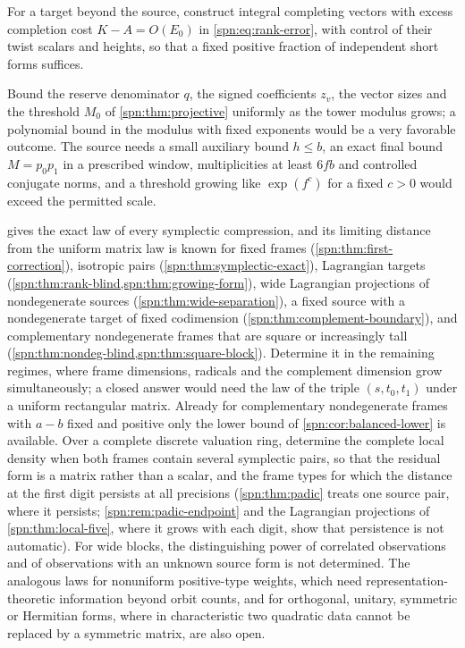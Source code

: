 \begin{question}\label{spn:q:completion}
For a target beyond the source, construct integral completing vectors with
excess completion cost $K-A=O(E_0)$ in \eqref{spn:eq:rank-error}, with control
of their twist scalars and heights, so that a fixed positive fraction of
independent short forms suffices.
\end{question}

\begin{question}\label{spn:q:frames}
Bound the reserve denominator $q$, the signed coefficients $z_v$, the vector
sizes and the threshold $M_0$ of \cref{spn:thm:projective} uniformly as the
tower modulus grows; a polynomial bound in the modulus with fixed exponents
would be a very favorable outcome. The source needs a small auxiliary bound
$h\le b$, an exact final bound $M=p_0p_1$ in a prescribed window,
multiplicities at least $6fb$ and controlled conjugate norms, and a threshold
growing like $\exp(f^{c})$ for a fixed $c>0$ would exceed the permitted
scale.
\end{question}

\begin{question}\label{spn:q:symplectic}
 gives the exact law of every symplectic compression, and its
limiting distance from the uniform matrix law is known for fixed frames
(\cref{spn:thm:first-correction}), isotropic pairs (\cref{spn:thm:symplectic-exact}),
Lagrangian targets (\cref{spn:thm:rank-blind,spn:thm:growing-form}), wide Lagrangian projections of
nondegenerate sources (\cref{spn:thm:wide-separation}), a fixed source with a
nondegenerate target of fixed codimension (\cref{spn:thm:complement-boundary}), and
complementary nondegenerate frames that are square or increasingly tall
(\cref{spn:thm:nondeg-blind,spn:thm:square-block}). Determine it in the remaining regimes, where
frame dimensions, radicals and the complement dimension grow simultaneously; a closed answer
would need the law of the triple $(s,t_0,t_1)$ under a uniform rectangular matrix. Already for
complementary nondegenerate frames with $a-b$ fixed and positive only the lower bound of
\cref{spn:cor:balanced-lower} is available. Over a complete discrete valuation ring, determine
the complete local density when both frames contain several symplectic pairs, so that the
residual form is a matrix rather than a scalar, and the frame types for which the distance at
the first digit persists at all precisions (\cref{spn:thm:padic} treats one source pair, where it
persists; \cref{spn:rem:padic-endpoint} and the Lagrangian projections of \cref{spn:thm:local-five},
where it grows with each digit, show that persistence is not automatic). For wide blocks, the
distinguishing power of correlated observations and of observations with an unknown source form is
not determined. The analogous laws for
nonuniform positive-type weights, which need representation-theoretic information beyond orbit
counts, and for orthogonal, unitary, symmetric or Hermitian forms, where in characteristic two
quadratic data cannot be replaced by a symmetric matrix, are also open.
\end{question}

